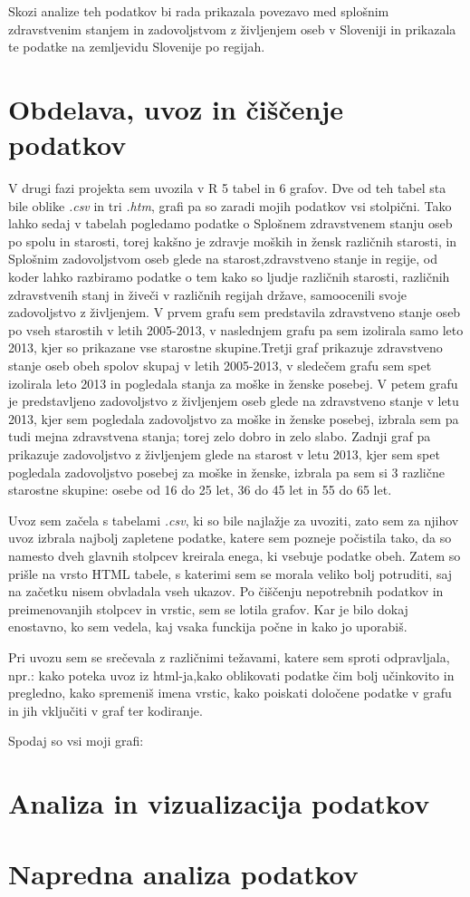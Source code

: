 \documentclass[11pt,a4paper]{article}
\begin{document}
Skozi analize teh podatkov bi rada prikazala povezavo med splošnim zdravstvenim stanjem in zadovoljstvom z življenjem oseb v Sloveniji in prikazala te podatke na zemljevidu Slovenije po regijah.
\newpage
\section{Obdelava, uvoz in čiščenje podatkov}
V drugi fazi projekta sem uvozila v R 5 tabel in 6 grafov. Dve od teh tabel sta bile oblike \textit{.csv} in tri \textit{.htm}, grafi pa so zaradi mojih podatkov vsi stolpični. Tako lahko sedaj v tabelah pogledamo podatke o Splošnem zdravstvenem stanju oseb po spolu in starosti, torej kakšno je zdravje moških in žensk različnih starosti, in Splošnim zadovoljstvom oseb glede na starost,zdravstveno stanje in regije, od koder lahko razbiramo podatke o tem kako so ljudje različnih starosti, različnih zdravstvenih stanj in živeči v različnih regijah države, samoocenili svoje zadovoljstvo z življenjem. V prvem grafu sem predstavila zdravstveno stanje oseb po vseh starostih v letih 2005-2013, v naslednjem grafu pa sem izolirala samo leto 2013, kjer so prikazane vse starostne skupine.Tretji graf prikazuje zdravstveno stanje oseb obeh spolov skupaj v letih 2005-2013, v sledečem grafu sem spet izolirala leto 2013 in pogledala stanja za moške in ženske posebej. V petem grafu je predstavljeno zadovoljstvo z življenjem oseb glede na zdravstveno stanje v letu 2013, kjer sem pogledala zadovoljstvo za moške in ženske posebej, izbrala sem pa tudi mejna zdravstvena stanja; torej zelo dobro in zelo slabo. Zadnji graf pa prikazuje zadovoljstvo z življenjem glede na starost v letu 2013, kjer sem spet pogledala zadovoljstvo posebej za moške in ženske, izbrala pa sem si 3 različne starostne skupine: osebe od 16 do 25 let, 36 do 45 let in 55 do 65 let.

Uvoz sem začela s tabelami \textit{.csv}, ki so bile najlažje za uvoziti, zato sem za njihov uvoz izbrala najbolj zapletene podatke, katere sem pozneje počistila tako, da so namesto dveh glavnih stolpcev kreirala enega, ki vsebuje podatke obeh. Zatem so prišle na vrsto HTML tabele, s katerimi sem se morala veliko bolj potruditi, saj na začetku nisem obvladala vseh ukazov. Po čiščenju nepotrebnih podatkov in preimenovanjih stolpcev in vrstic, sem se lotila grafov. Kar je bilo dokaj enostavno, ko sem vedela, kaj vsaka funckija počne in kako jo uporabiš.

 Pri uvozu sem se srečevala z različnimi težavami, katere sem sproti odpravljala, npr.: kako poteka uvoz iz html-ja,kako oblikovati podatke čim bolj učinkovito in pregledno, kako spremeniš imena vrstic, kako poiskati določene podatke v grafu in jih vključiti v graf ter kodiranje.

Spodaj so vsi moji grafi:



\section{Analiza in vizualizacija podatkov}


\section{Napredna analiza podatkov}

\end{document}
